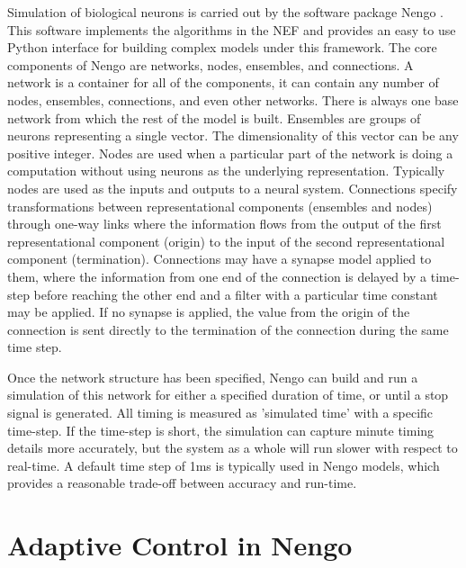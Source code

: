 \documentclass[letterpaper,12pt,titlepage,oneside,final]{book}
\begin{document}
Simulation of biological neurons is carried out by the software package Nengo \cite{bekolay2013nengo}.
This software implements the algorithms in the NEF and provides an easy to use Python interface for building complex models under this framework.
The core components of Nengo are networks, nodes, ensembles, and connections.
A network is a container for all of the components, it can contain any number of nodes, ensembles, connections, and even other networks.
There is always one base network from which the rest of the model is built.
Ensembles are groups of neurons representing a single vector. 
The dimensionality of this vector can be any positive integer.
Nodes are used when a particular part of the network is doing a computation without using neurons as the underlying representation.
Typically nodes are used as the inputs and outputs to a neural system.
Connections specify transformations between representational components (ensembles and nodes) through one-way links where the information flows from the output of the first representational component (origin) to the input of the second representational component (termination).
Connections may have a synapse model applied to them, where the information from one end of the connection is delayed by a time-step before reaching the other end and a filter with a particular time constant may be applied.
If no synapse is applied, the value from the origin of the connection is sent directly to the termination of the connection during the same time step.

Once the network structure has been specified, Nengo can build and run a simulation of this network for either a specified duration of time, or until a stop signal is generated. 
All timing is measured as 'simulated time' with a specific time-step. 
If the time-step is short, the simulation can capture minute timing details more accurately, but the system as a whole will run slower with respect to real-time. A default time step of 1ms is typically used in Nengo models, which provides a reasonable trade-off between accuracy and run-time.

\section{Adaptive Control in Nengo}

\end{document}
